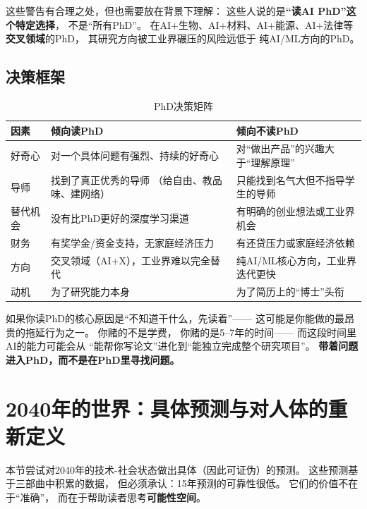 这些警告有合理之处，但也需要放在背景下理解：
这些人说的是\textbf{``读AI PhD''这个特定选择}，
不是``所有PhD''。
在AI+生物、AI+材料、AI+能源、AI+法律等
\textbf{交叉领域}的PhD，
其研究方向被工业界碾压的风险远低于
纯AI/ML方向的PhD。

\subsection{决策框架}

\begin{table}[htbp]
\centering
\caption{PhD决策矩阵}
\label{tab:phd-decision}
\small
\begin{tabularx}{\textwidth}{l X X}
\toprule
\rowcolor{figLightGray}
\textbf{因素} & \textbf{倾向读PhD} & \textbf{倾向不读PhD} \\
\midrule
好奇心 & 对一个具体问题有强烈、持续的好奇心 &
  对``做出产品''的兴趣大于``理解原理'' \\
\midrule
导师 & 找到了真正优秀的导师
  （给自由、教品味、建网络） &
  只能找到名气大但不指导学生的导师 \\
\midrule
替代机会 & 没有比PhD更好的深度学习渠道 &
  有明确的创业想法或工业界机会 \\
\midrule
财务 & 有奖学金/资金支持，无家庭经济压力 &
  有还贷压力或家庭经济依赖 \\
\midrule
方向 & 交叉领域（AI+X），工业界难以完全替代 &
  纯AI/ML核心方向，工业界迭代更快 \\
\midrule
动机 & 为了研究能力本身 &
  为了简历上的``博士''头衔 \\
\bottomrule
\end{tabularx}
\end{table}

\begin{warnbox}[最危险的PhD动机]
如果你读PhD的核心原因是``不知道干什么，先读着''——
这可能是你能做的最昂贵的拖延行为之一。
你赌的不是学费，
你赌的是5--7年的时间——
而这段时间里AI的能力可能会从
``能帮你写论文''进化到``能独立完成整个研究项目''。
\textbf{带着问题进入PhD，而不是在PhD里寻找问题。}
\end{warnbox}


\section{2040年的世界：具体预测与对人体的重新定义}
\label{sec:fg-2040}

本节尝试对2040年的技术-社会状态做出具体（因此可证伪）的预测。
这些预测基于三部曲中积累的数据，
但必须承认：15年预测的可靠性很低。
它们的价值不在于``准确''，
而在于帮助读者思考\textbf{可能性空间}。

